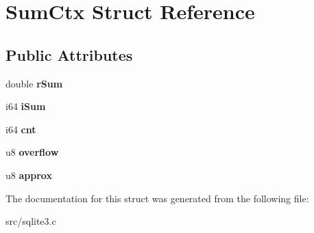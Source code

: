 \hypertarget{struct_sum_ctx}{\section{Sum\-Ctx Struct Reference}
\label{struct_sum_ctx}
}
\subsection*{Public Attributes}
\begin{DoxyCompactItemize}
\item 
\hypertarget{struct_sum_ctx_a1774080b9bcada2f4e867eaf40763f41}{double {\bfseries r\-Sum}}\label{struct_sum_ctx_a1774080b9bcada2f4e867eaf40763f41}

\item 
\hypertarget{struct_sum_ctx_ace6196fb30ebc0687997a723d55683db}{i64 {\bfseries i\-Sum}}\label{struct_sum_ctx_ace6196fb30ebc0687997a723d55683db}

\item 
\hypertarget{struct_sum_ctx_ada00261fe604a7cc6719fdcd8bb5914c}{i64 {\bfseries cnt}}\label{struct_sum_ctx_ada00261fe604a7cc6719fdcd8bb5914c}

\item 
\hypertarget{struct_sum_ctx_a3b14a5da00584aff08314d5e9ddbe9ea}{u8 {\bfseries overflow}}\label{struct_sum_ctx_a3b14a5da00584aff08314d5e9ddbe9ea}

\item 
\hypertarget{struct_sum_ctx_a035a2a22271fee066d9a92d12fe3b9a5}{u8 {\bfseries approx}}\label{struct_sum_ctx_a035a2a22271fee066d9a92d12fe3b9a5}

\end{DoxyCompactItemize}


The documentation for this struct was generated from the following file\-:\begin{DoxyCompactItemize}
\item 
src/sqlite3.\-c\end{DoxyCompactItemize}
